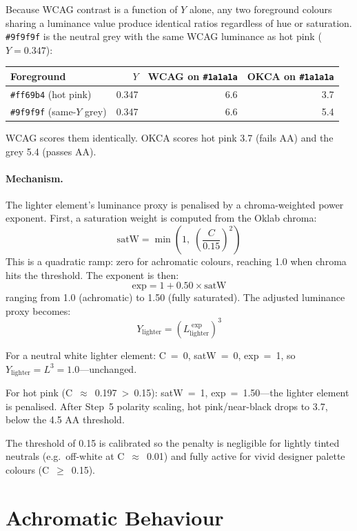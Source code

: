 \documentclass[11pt,a4paper]{article}
\begin{document}
Because WCAG contrast is a function of $Y$ alone, any two foreground
colours sharing a luminance value produce identical ratios regardless
of hue or saturation.  \texttt{\#9f9f9f} is the neutral grey with the
same WCAG luminance as hot pink ($Y = 0.347$):

\begin{table}[h]
\centering
\begin{tabular}{@{}lrrr@{}}
\toprule
\textbf{Foreground} & $Y$ & \textbf{WCAG on \texttt{\#1a1a1a}} & \textbf{OKCA on \texttt{\#1a1a1a}} \\
\midrule
\texttt{\#ff69b4} (hot pink)      & 0.347 & 6.6 & 3.7 \\
\texttt{\#9f9f9f} (same-$Y$ grey) & 0.347 & 6.6 & 5.4 \\
\bottomrule
\end{tabular}
\end{table}

WCAG scores them identically.  OKCA scores hot pink 3.7 (fails AA)
and the grey 5.4 (passes AA).

\paragraph{Mechanism.}
The lighter element's luminance proxy is penalised by a chroma-weighted
power exponent.  First, a saturation weight is computed from the Oklab
chroma:
\[
  \text{satW} = \min\!\left(1,\;\left(\frac{C}{0.15}\right)^{\!2}\right)
\]
This is a quadratic ramp: zero for achromatic colours, reaching 1.0 when
chroma hits the threshold.  The exponent is then:
\[
  \text{exp} = 1 + 0.50 \times \text{satW}
\]
ranging from 1.0 (achromatic) to 1.50 (fully saturated).  The adjusted
luminance proxy becomes:
\[
  Y_{\text{lighter}} = \left(L_{\text{lighter}}^{\;\text{exp}}\right)^3
\]

For a neutral white lighter element: C~=~0, satW~=~0, exp~=~1, so
$Y_{\text{lighter}} = L^3 = 1.0$---unchanged.

For hot pink (C~$\approx$~0.197~>~0.15): satW~=~1, exp~=~1.50---the
lighter element is penalised.  After Step~5 polarity scaling, hot
pink/near-black drops to 3.7, below the 4.5 AA threshold.

The threshold of 0.15 is calibrated so the penalty is negligible for
lightly tinted neutrals (e.g.\ off-white at C~$\approx$~0.01) and fully
active for vivid designer palette colours (C~$\ge$~0.15).

\section{Achromatic Behaviour}
\end{document}
